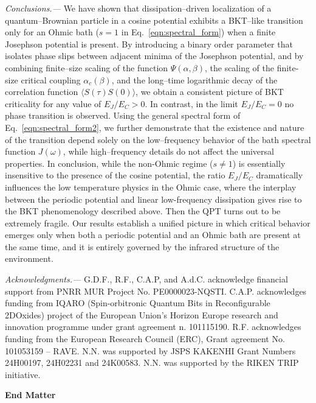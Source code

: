 \documentclass[aps,notitlepage,twocolumn,prl,nolongbibliography,superscriptaddress]{revtex4-2}
\begin{document}
\textit{Conclusions.---}
We have shown that dissipation--driven localization of a quantum--Brownian particle in a cosine potential exhibits a BKT–like transition only for an Ohmic bath ($s=1$ in Eq.~\eqref{eqn:spectral_form}) when a finite Josephson potential is present. By introducing a binary order parameter that isolates phase slips between adjacent minima of the Josephson potential, and by combining finite--size scaling of the function $\Psi(\alpha,\beta)$, the scaling of the finite-size critical coupling $\alpha_c(\beta)$, and the long--time logarithmic decay of the correlation function $\langle S(\tau)S(0)\rangle$, we obtain a consistent picture of BKT criticality for any value of $E_J/E_C>0$. In contrast, in the limit $E_J/E_C=0$ no phase transition is observed. Using the general spectral form of Eq.~\eqref{eqn:spectral_form2}, we further demonstrate that the existence and nature of the transition depend solely on the low--frequency behavior of the bath spectral function $J(\omega)$, while high--frequency details do not affect the universal properties. In conclusion, while the non-Ohmic regime ($s\neq 1$) is essentially insensitive to the presence of the cosine potential, the ratio $E_J/E_C$ dramatically influences the low temperature physics in the Ohmic case, where the interplay between the periodic potential and linear low-frequency dissipation gives rise to the BKT phenomenology described above. Then the QPT turns out to be extremely fragile. Our results establish a unified picture in which critical behavior emerges only when both a periodic potential and an Ohmic bath are present at the same time, and it is entirely governed by the infrared structure of the environment.

\textit{Acknowledgments.---}
G.D.F., R.F., C.A.P, and A.d.C. acknowledge financial support from PNRR MUR Project No. PE0000023-NQSTI. C.A.P. acknowledges funding from IQARO (Spin-orbitronic Quantum Bits in Reconfigurable 2DOxides) project of the European Union’s Horizon Europe research and innovation programme under grant agreement n. 101115190. R.F. acknowledges funding from the European Research Council (ERC), Grant agreement No. 101053159 – RAVE. N.N. was supported by JSPS KAKENHI Grant Numbers 24H00197, 24H02231 and 24K00583. N.N. was supported by the RIKEN TRIP initiative.



\clearpage

\appendix

{\Large \bf End Matter}
\end{document}
